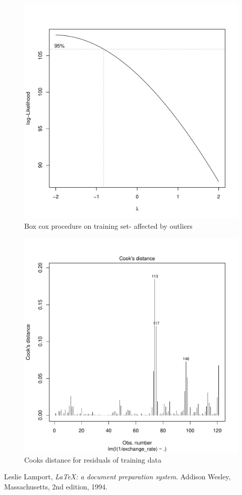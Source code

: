 \documentclass[12pt]{article}
\begin{document}
\begin{figure}
  \centering
    \includegraphics{boxcox.pdf}
  \caption{Box cox procedure on training set- affected by outliers}
  \label{fig:boxcox}
\end{figure}

\begin{figure}
  \centering
    \includegraphics{cooks.pdf}
  \caption{Cooks distance for residuals of training data}
  \label{fig:cooks}
\end{figure}




\newpage

\begin{thebibliography}{9}

  Leslie Lamport,
  \emph{\LaTeX: a document preparation system}.
  Addison Wesley, Massachusetts,
  2nd edition,
  1994.

\end{thebibliography}
\end{document}
